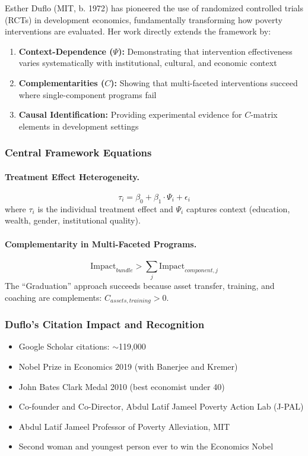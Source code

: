 Esther Duflo (MIT, b. 1972) has pioneered the use of randomized controlled trials (RCTs)
in development economics, fundamentally transforming how poverty interventions are
evaluated. Her work directly extends the framework by:
\begin{enumerate}
  \item \textbf{Context-Dependence ($\Psi$):} Demonstrating that intervention effectiveness varies
        systematically with institutional, cultural, and economic context
  \item \textbf{Complementarities ($C$):} Showing that multi-faceted interventions succeed where
        single-component programs fail
  \item \textbf{Causal Identification:} Providing experimental evidence for $C$-matrix elements in
        development settings
\end{enumerate}

\subsubsection{Central Framework Equations}

\paragraph{Treatment Effect Heterogeneity.}
\begin{equation}
  \tau_i = \beta_0 + \beta_1 \cdot \Psi_i + \epsilon_i
\end{equation}
where $\tau_i$ is the individual treatment effect and $\Psi_i$ captures context (education, wealth,
gender, institutional quality).

\paragraph{Complementarity in Multi-Faceted Programs.}
\begin{equation}
  \text{Impact}_{bundle} > \sum_j \text{Impact}_{component,j}
\end{equation}
The ``Graduation'' approach succeeds because asset transfer, training, and coaching
are complements: $C_{assets,training} > 0$.

\subsubsection{Duflo's Citation Impact and Recognition}

\begin{itemize}
  \item Google Scholar citations: $\sim$119,000
  \item Nobel Prize in Economics 2019 (with Banerjee and Kremer)
  \item John Bates Clark Medal 2010 (best economist under 40)
  \item Co-founder and Co-Director, Abdul Latif Jameel Poverty Action Lab (J-PAL)
  \item Abdul Latif Jameel Professor of Poverty Alleviation, MIT
  \item Second woman and youngest person ever to win the Economics Nobel
\end{itemize}

